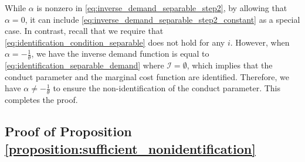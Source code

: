 \documentclass[11pt, a4paper]{article}
\begin{document}
While $\alpha$ is nonzero in \eqref{eq:inverse_demand_separable_step2}, by allowing that $\alpha = 0$, it can include \eqref{eq:inverse_demand_separable_step2_constant} as a special case.
In contrast, recall that we require that \eqref{eq:identification_condition_separable} does not hold for any $i$.
However, when $\alpha = -\frac{1}{\theta}$, we have the inverse demand function is equal to \eqref{eq:identification_separable_demand} where $\mathcal{I} = \emptyset$, which implies that the conduct parameter and the marginal cost function are identified. 
Therefore, we have $\alpha \ne -\frac{1}{\theta}$ to ensure the non-identification of the conduct parameter.
This completes the proof.






\subsection{Proof of Proposition \ref{proposition:sufficient_nonidentification}}
\end{document}
